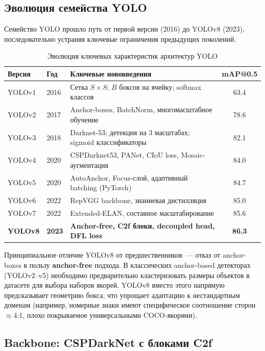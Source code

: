 \documentclass[14pt,a4paper]{report}
\numberwithin{equation}{chapter}
\numberwithin{figure}{chapter}
\numberwithin{table}{chapter}
\begin{document}
\subsection{Эволюция семейства YOLO}

Семейство YOLO прошло путь от первой версии (2016) до YOLOv8 (2023),
последовательно устраняя ключевые ограничения предыдущих поколений.

\begin{table}[H]
\centering
\caption{Эволюция ключевых характеристик архитектур YOLO}
\label{tab:yolo_evolution}
\begin{tabularx}{\textwidth}{llXc}
\toprule
\textbf{Версия} & \textbf{Год} & \textbf{Ключевые нововведения} & \textbf{mAP@0.5} \\
\midrule
YOLOv1  & 2016 & Сетка $S\!\times\!S$; $B$ боксов на ячейку; softmax классов & 63.4 \\
YOLOv2  & 2017 & Anchor-boxes, BatchNorm, многомасштабное обучение & 78.6 \\
YOLOv3  & 2018 & Darknet-53; детекция на 3 масштабах; sigmoid классификаторы & 82.1 \\
YOLOv4  & 2020 & CSPDarknet53, PANet, CIoU loss, Mosaic-аугментация & 84.0 \\
YOLOv5  & 2020 & AutoAnchor, Focus-слой, адаптивный batching (PyTorch) & 84.7 \\
YOLOv6  & 2022 & RepVGG backbone, знаниевая дистилляция & 85.0 \\
YOLOv7  & 2022 & Extended-ELAN, составное масштабирование & 85.6 \\
\textbf{YOLOv8} & \textbf{2023} & \textbf{Anchor-free, C2f блоки, decoupled head, DFL loss} & \textbf{86.3} \\
\bottomrule
\end{tabularx}
\end{table}

Принципиальное отличие YOLOv8 от предшественников~--- отказ от
anchor-boxes в пользу \textbf{anchor-free} подхода. В классических
anchor-based детекторах (YOLOv2--v5) необходимо предварительно
кластеризовать размеры объектов в датасете для выбора наборов якорей.
YOLOv8 вместо этого напрямую предсказывает геометрию бокса, что
упрощает адаптацию к нестандартным доменам (например, номерные знаки
имеют специфическое соотношение сторон $\approx$4:1, плохо покрываемое
универсальными COCO-якорями).

\subsection{Backbone: CSPDarkNet с блоками C2f}
\end{document}
